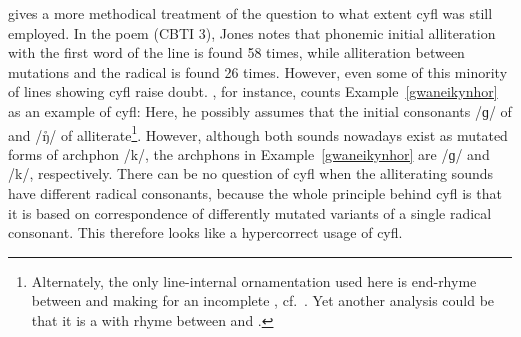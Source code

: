 \Textcite{jones_meddwl_2005} gives a more methodical treatment of the question to what extent \gls{cyfl} was still employed. In the poem  (\acrshort{CBTI} 3), Jones notes that phonemic initial alliteration with the first word of the line is found 58 times, while alliteration between mutations and the radical is found 26 times. 
However, even some of this minority of lines showing  \gls{cyfl} raise doubt. \Textcite[162]{jones_meddwl_2005}, for instance, counts Example~\ref{gwaneikynhor} as an example of \gls{cyfl}:
Here, he possibly assumes that the initial consonants /ɡ/ of  and /ŋ̊/ of  alliterate\footnote{Alternately, the only line-internal ornamentation used here is end-rhyme between  and  making for an incomplete , cf.\ \textcite[xlvii]{andrews_welsh_2007}. Yet another analysis could be that it is a  with rhyme between  and .}. However, although both sounds nowadays exist as mutated forms of \gls{archphon} /k/, the \gls{archphon}s in Example~\ref{gwaneikynhor}  are /ɡ/ and /k/, respectively. There can be no question of \gls{cyfl} when the alliterating sounds have different radical consonants, because the whole principle behind \gls{cyfl} is that it is based on correspondence of differently mutated variants of a single radical consonant.  This therefore looks like a hypercorrect usage of \gls{cyfl}. 



